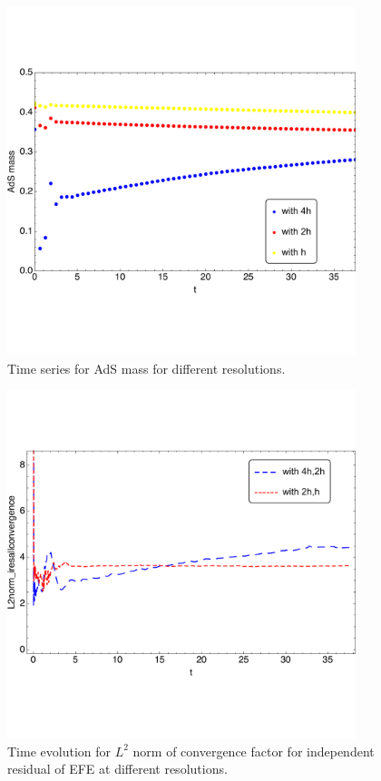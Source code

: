 \documentclass[12pt]{iopart} %
\begin{document}
\begin{figure}[h]
        \centering
        \includegraphics[width=4.0in,clip=true]{plots/timeseries/AdSmass/fullplotAdSmassL1L2L3res-cropped.pdf}
\parbox{5.0in}{\caption{Time series for AdS mass for different resolutions.
        }\label{fig:AdSmass-crop}}
\end{figure}

\begin{figure}[h]
        \centering
        \includegraphics[width=4.0in,clip=true]{plots/timeseries/L2norm_iresallconvergence/fullplotiresallconvergenceL1L2L3res-cropped.pdf}
\parbox{5.0in}{\caption{Time evolution for $L^2$ norm of convergence factor for independent residual of EFE at different resolutions.
        }\label{fig:L2norm_iresallconvergence-crop}}
\end{figure}
\end{document}
